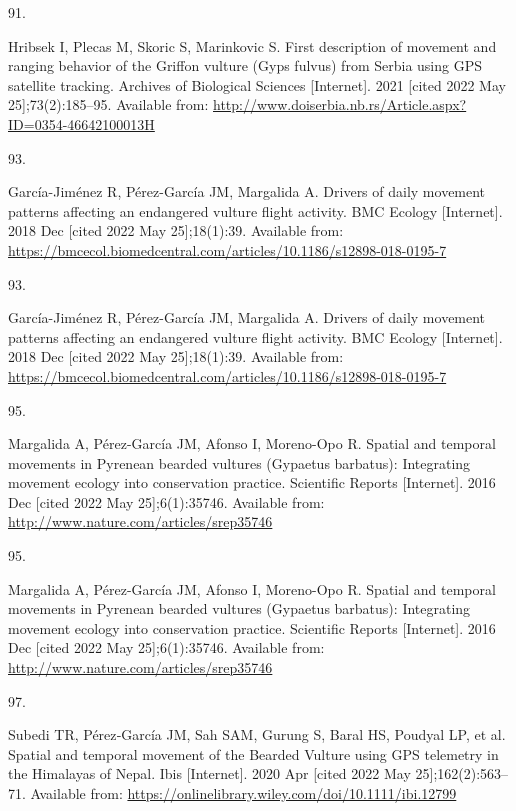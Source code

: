 \documentclass[10pt,a4paper]{article}
\newlength{\cslhangindent}
\newlength{\csllabelwidth}
\newlength{\cslentryspacingunit} %
\newenvironment{CSLReferences}[2] %
 {%
  \setlength{\parindent}{0pt}
  \ifodd #1
  \let\oldpar\par
  \def\par{\hangindent=\cslhangindent\oldpar}
  \fi
  \setlength{\parskip}{#2\cslentryspacingunit}
 }%
 {}
\newcommand{\CSLLeftMargin}[1]{\parbox[t]{\csllabelwidth}{#1}}
\newcommand{\CSLRightInline}[1]{\parbox[t]{\linewidth - \csllabelwidth}{#1}\break}
\begin{document}
\begin{CSLReferences}{0}{0}
\leavevmode\hypertarget{ref-hribsek_first_2021}{}%
\CSLLeftMargin{91. }
\CSLRightInline{Hribsek I, Plecas M, Skoric S, Marinkovic S. First description of movement and ranging behavior of the {Griffon} vulture ({Gyps} fulvus) from {Serbia} using {GPS} satellite tracking. Archives of Biological Sciences {[}Internet{]}. 2021 {[}cited 2022 May 25{]};73(2):185--95. Available from: \url{http://www.doiserbia.nb.rs/Article.aspx?ID=0354-46642100013H}}

\leavevmode\hypertarget{ref-garcia-jimenez_drivers_2018}{}%
\CSLLeftMargin{93. }
\CSLRightInline{García-Jiménez R, Pérez-García JM, Margalida A. Drivers of daily movement patterns affecting an endangered vulture flight activity. BMC Ecology {[}Internet{]}. 2018 Dec {[}cited 2022 May 25{]};18(1):39. Available from: \url{https://bmcecol.biomedcentral.com/articles/10.1186/s12898-018-0195-7}}

\leavevmode\hypertarget{ref-garcia-jimenez_drivers_2018}{}%
\CSLLeftMargin{93. }
\CSLRightInline{García-Jiménez R, Pérez-García JM, Margalida A. Drivers of daily movement patterns affecting an endangered vulture flight activity. BMC Ecology {[}Internet{]}. 2018 Dec {[}cited 2022 May 25{]};18(1):39. Available from: \url{https://bmcecol.biomedcentral.com/articles/10.1186/s12898-018-0195-7}}

\leavevmode\hypertarget{ref-margalida_spatial_2016}{}%
\CSLLeftMargin{95. }
\CSLRightInline{Margalida A, Pérez-García JM, Afonso I, Moreno-Opo R. Spatial and temporal movements in {Pyrenean} bearded vultures ({Gypaetus} barbatus): {Integrating} movement ecology into conservation practice. Scientific Reports {[}Internet{]}. 2016 Dec {[}cited 2022 May 25{]};6(1):35746. Available from: \url{http://www.nature.com/articles/srep35746}}

\leavevmode\hypertarget{ref-margalida_spatial_2016}{}%
\CSLLeftMargin{95. }
\CSLRightInline{Margalida A, Pérez-García JM, Afonso I, Moreno-Opo R. Spatial and temporal movements in {Pyrenean} bearded vultures ({Gypaetus} barbatus): {Integrating} movement ecology into conservation practice. Scientific Reports {[}Internet{]}. 2016 Dec {[}cited 2022 May 25{]};6(1):35746. Available from: \url{http://www.nature.com/articles/srep35746}}

\leavevmode\hypertarget{ref-subedi_spatial_2020}{}%
\CSLLeftMargin{97. }
\CSLRightInline{Subedi TR, Pérez‐García JM, Sah SAM, Gurung S, Baral HS, Poudyal LP, et al. Spatial and temporal movement of the {Bearded} {Vulture} using {GPS} telemetry in the {Himalayas} of {Nepal}. Ibis {[}Internet{]}. 2020 Apr {[}cited 2022 May 25{]};162(2):563--71. Available from: \url{https://onlinelibrary.wiley.com/doi/10.1111/ibi.12799}}


\end{CSLReferences}
\end{document}
